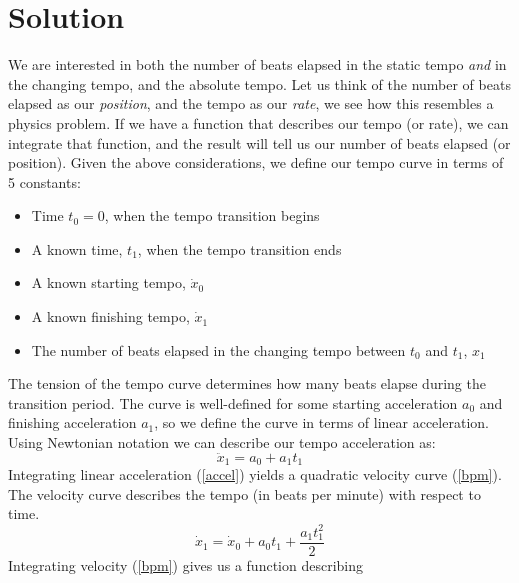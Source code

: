 \section{Solution}
\label{sec:polytempic-solution}
We are interested in both the number of beats elapsed in the static
tempo \emph{and} in the changing tempo, and the absolute tempo. Let us
think of the number of beats elapsed as our \emph{position}, and the
tempo as our \emph{rate}, we see how this resembles a physics
problem. If we have a function that describes our tempo (or rate), we
can integrate that function, and the result will tell us our number of
beats elapsed (or position). Given the above considerations, we define
our tempo curve in terms of 5 constants:
\hfill\break
\begin{fullwidth}
\begin{itemize}
  \item Time $t_0=0$, when the tempo transition begins
  \item A known time, $t_1$, when the tempo transition ends
  \item A known starting tempo, $\dot{x}_0$
  \item A known finishing tempo, $\dot{x}_1$
  \item The number of beats elapsed in the changing tempo between
    $t_0$ and $t_1$, $x_1$
\end{itemize}
\end{fullwidth}
\hfill\break
The tension of the tempo curve determines how many beats elapse during
the transition period. The curve is well-defined for some starting
acceleration $a_0$ and finishing acceleration $a_1$, so we define the
curve in terms of linear acceleration. Using Newtonian notation we can
describe our tempo acceleration as:
\begin{equation}
	\label{accel}
    \ddot{x}_1 = a_0 + a_1t_1
\end{equation}
Integrating linear acceleration (\ref{accel}) yields a quadratic
velocity curve (\ref{bpm}). The velocity curve describes the tempo (in beats per
minute) with respect to
time.
\begin{equation}
	\label{bpm}
    \dot{x}_1 = \dot{x}_0 + a_0t_1 + \frac{a_1t_1^2}{2}
\end{equation}
Integrating velocity (\ref{bpm}) gives us a function describing
